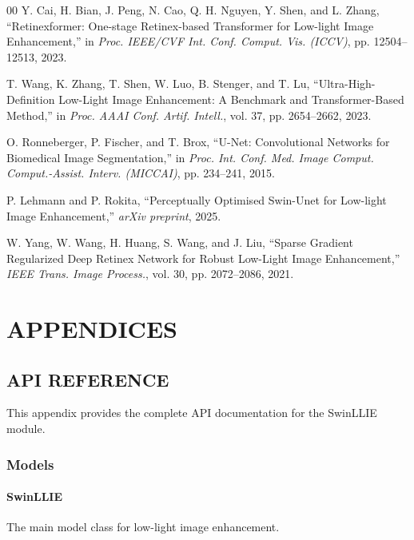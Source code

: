 \documentclass[12pt, a4paper]{report}
\begin{document}
\begin{thebibliography}{00}
Y. Cai, H. Bian, J. Peng, N. Cao, Q. H. Nguyen, Y. Shen, and L. Zhang, ``Retinexformer: One-stage Retinex-based Transformer for Low-light Image Enhancement,'' in \textit{Proc. IEEE/CVF Int. Conf. Comput. Vis. (ICCV)}, pp. 12504--12513, 2023.

T. Wang, K. Zhang, T. Shen, W. Luo, B. Stenger, and T. Lu, ``Ultra-High-Definition Low-Light Image Enhancement: A Benchmark and Transformer-Based Method,'' in \textit{Proc. AAAI Conf. Artif. Intell.}, vol. 37, pp. 2654--2662, 2023.

O. Ronneberger, P. Fischer, and T. Brox, ``U-Net: Convolutional Networks for Biomedical Image Segmentation,'' in \textit{Proc. Int. Conf. Med. Image Comput. Comput.-Assist. Interv. (MICCAI)}, pp. 234--241, 2015.

P. Lehmann and P. Rokita, ``Perceptually Optimised Swin-Unet for Low-light Image Enhancement,'' \textit{arXiv preprint}, 2025.

W. Yang, W. Wang, H. Huang, S. Wang, and J. Liu, ``Sparse Gradient Regularized Deep Retinex Network for Robust Low-Light Image Enhancement,'' \textit{IEEE Trans. Image Process.}, vol. 30, pp. 2072--2086, 2021.

\end{thebibliography}

\clearpage
\appendix
\chapter*{APPENDICES}
\renewcommand{\thesection}{\Alph{section}}
\setcounter{section}{0}

\section{API REFERENCE}
This appendix provides the complete API documentation for the SwinLLIE module.

\subsection{Models}
\subsubsection{SwinLLIE}
The main model class for low-light image enhancement.
\end{document}

